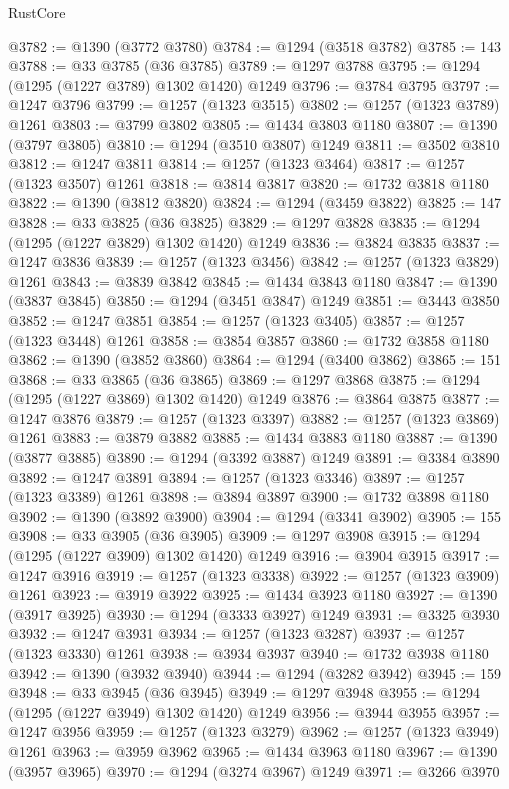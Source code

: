 \begin{lexlean}{RustCore}
\begin{coremodule}
@3782 := @1390 (@3772 @3780)
@3784 := @1294 (@3518 @3782)
@3785 := 143
@3788 := @33 @3785 (@36 @3785)
@3789 := @1297 @3788
@3795 := @1294 (@1295 (@1227 @3789) @1302 @1420) @1249
@3796 := @3784 @3795
@3797 := @1247 @3796
@3799 := @1257 (@1323 @3515)
@3802 := @1257 (@1323 @3789) @1261
@3803 := @3799 @3802
@3805 := @1434 @3803 @1180
@3807 := @1390 (@3797 @3805)
@3810 := @1294 (@3510 @3807) @1249
@3811 := @3502 @3810
@3812 := @1247 @3811
@3814 := @1257 (@1323 @3464)
@3817 := @1257 (@1323 @3507) @1261
@3818 := @3814 @3817
@3820 := @1732 @3818 @1180
@3822 := @1390 (@3812 @3820)
@3824 := @1294 (@3459 @3822)
@3825 := 147
@3828 := @33 @3825 (@36 @3825)
@3829 := @1297 @3828
@3835 := @1294 (@1295 (@1227 @3829) @1302 @1420) @1249
@3836 := @3824 @3835
@3837 := @1247 @3836
@3839 := @1257 (@1323 @3456)
@3842 := @1257 (@1323 @3829) @1261
@3843 := @3839 @3842
@3845 := @1434 @3843 @1180
@3847 := @1390 (@3837 @3845)
@3850 := @1294 (@3451 @3847) @1249
@3851 := @3443 @3850
@3852 := @1247 @3851
@3854 := @1257 (@1323 @3405)
@3857 := @1257 (@1323 @3448) @1261
@3858 := @3854 @3857
@3860 := @1732 @3858 @1180
@3862 := @1390 (@3852 @3860)
@3864 := @1294 (@3400 @3862)
@3865 := 151
@3868 := @33 @3865 (@36 @3865)
@3869 := @1297 @3868
@3875 := @1294 (@1295 (@1227 @3869) @1302 @1420) @1249
@3876 := @3864 @3875
@3877 := @1247 @3876
@3879 := @1257 (@1323 @3397)
@3882 := @1257 (@1323 @3869) @1261
@3883 := @3879 @3882
@3885 := @1434 @3883 @1180
@3887 := @1390 (@3877 @3885)
@3890 := @1294 (@3392 @3887) @1249
@3891 := @3384 @3890
@3892 := @1247 @3891
@3894 := @1257 (@1323 @3346)
@3897 := @1257 (@1323 @3389) @1261
@3898 := @3894 @3897
@3900 := @1732 @3898 @1180
@3902 := @1390 (@3892 @3900)
@3904 := @1294 (@3341 @3902)
@3905 := 155
@3908 := @33 @3905 (@36 @3905)
@3909 := @1297 @3908
@3915 := @1294 (@1295 (@1227 @3909) @1302 @1420) @1249
@3916 := @3904 @3915
@3917 := @1247 @3916
@3919 := @1257 (@1323 @3338)
@3922 := @1257 (@1323 @3909) @1261
@3923 := @3919 @3922
@3925 := @1434 @3923 @1180
@3927 := @1390 (@3917 @3925)
@3930 := @1294 (@3333 @3927) @1249
@3931 := @3325 @3930
@3932 := @1247 @3931
@3934 := @1257 (@1323 @3287)
@3937 := @1257 (@1323 @3330) @1261
@3938 := @3934 @3937
@3940 := @1732 @3938 @1180
@3942 := @1390 (@3932 @3940)
@3944 := @1294 (@3282 @3942)
@3945 := 159
@3948 := @33 @3945 (@36 @3945)
@3949 := @1297 @3948
@3955 := @1294 (@1295 (@1227 @3949) @1302 @1420) @1249
@3956 := @3944 @3955
@3957 := @1247 @3956
@3959 := @1257 (@1323 @3279)
@3962 := @1257 (@1323 @3949) @1261
@3963 := @3959 @3962
@3965 := @1434 @3963 @1180
@3967 := @1390 (@3957 @3965)
@3970 := @1294 (@3274 @3967) @1249
@3971 := @3266 @3970

\end{coremodule}
\end{lexlean}
